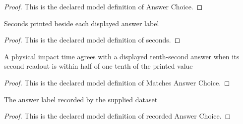 \begin{proof}
  This is the declared model definition of Answer Choice.
\end{proof}
\begin{definition}[seconds]
  \label{def:physics:phyx-mini-0731:phyxminiproblems-problemphyxmini0731-answerchoice-seconds}
  Seconds printed beside each displayed answer label
\end{definition}
\begin{proof}
  This is the declared model definition of seconds.
\end{proof}
\begin{definition}
  \label{def:physics:phyx-mini-0731:phyxminiproblems-problemphyxmini0731-matchesanswerchoice}
  A physical impact time agrees with a displayed tenth-second answer when its second readout is within half of one tenth of the printed value
\end{definition}
\begin{proof}
  This is the declared model definition of Matches Answer Choice.
\end{proof}
\begin{definition}
  \label{def:physics:phyx-mini-0731:phyxminiproblems-problemphyxmini0731-recordedanswerchoice}
  The answer label recorded by the supplied dataset
\end{definition}
\begin{proof}
  This is the declared model definition of recorded Answer Choice.
\end{proof}
